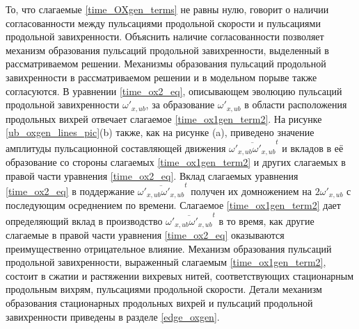 То, что слагаемые \eqref{time_OXgen_terms} не равны нулю, говорит о наличии согласованности между пульсациями продольной скорости и пульсациями продольной завихренности. Объяснить наличие согласованности позволяет механизм образования пульсаций продольной завихренности, выделенный в рассматриваемом решении. Механизмы образования пульсаций продольной завихренности в рассматриваемом решении и в модельном порыве также согласуются. В уравнении \eqref{time_ox2_eq}, описывающем эволюцию пульсаций продольной завихренности $\omega'_{x,ub}$, за образование $\omega'_{x,ub}$ в области расположения продольных вихрей отвечает слагаемое \eqref{time_ox1gen_term2}. На рисунке \ref{ub_oxgen_lines_pic}(b) также, как на рисунке (a), приведено значение амплитуды пульсационной составляющей движения $\overline{\omega'_{x,ub}\omega'_{x,ub}}^t$ и вкладов в её образование со стороны слагаемых \eqref{time_ox1gen_term2} и других слагаемых в правой части уравнения \eqref{time_ox2_eq}. Вклад слагаемых уравнения \eqref{time_ox2_eq} в поддержание $\overline{\omega'_{x,ub}\omega'_{x,ub}}^t$ получен их домножением на $2\omega'_{x,ub}$ с последующим осреднением по времени. Слагаемое \eqref{time_ox1gen_term2} дает определяющий вклад в производство  $\overline{\omega'_{x,ub}\omega'_{x,ub}}^t$ в то время, как другие слагаемые в правой части уравнения \eqref{time_ox2_eq} оказываются преимущественно отрицательное влияние. Механизм образования пульсаций продольной завихренности, выраженный слагаемым \eqref{time_ox1gen_term2}, состоит в сжатии и растяжении вихревых нитей, соответствующих стационарным продольным вихрям, пульсациями продольной скорости. Детали механизм образования стационарных продольных вихрей и пульсаций продольной завихренности приведены в разделе \ref{edge_oxgen}.


